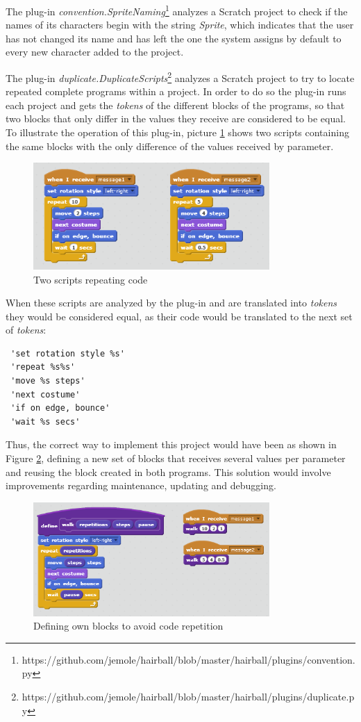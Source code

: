 \documentclass[conference]{format/IEEEtran}
\begin{document}
The plug-in \textit{convention.SpriteNaming}\footnote{https://github.com/jemole/hairball/blob/master/hairball/plugins/convention.py} analyzes a Scratch project to check if the names of its characters begin with the string \textit{Sprite}, which indicates that the user has not changed its name and has left the one the system assigns by default to every new character added to the project.

The plug-in \textit{duplicate.DuplicateScripts}\footnote{https://github.com/jemole/hairball/blob/master/hairball/plugins/duplicate.py} analyzes a Scratch project to try to locate repeated complete programs within a project. In order to do so the plug-in runs each project and gets the \textit{tokens} of the different blocks of the programs, so that two blocks that only differ in the values they receive are considered to be equal. To illustrate the operation of this plug-in, picture \ref{fig:CodeRepetition1} shows two scripts containing the same blocks with the only difference of the values received by parameter.
\begin{figure}
  \centering
    \includegraphics[width=9cm]{img/CodeRepetition1.png}
  \caption{Two scripts repeating code}
  \label{fig:CodeRepetition1}
\end{figure}


When these scripts are analyzed by the plug-in and are translated into \textit{tokens} they would be considered equal, as their code would be translated to the next set of \textit{tokens}:
\begin{verbatim}
 'set rotation style %s'
 'repeat %s%s'
 'move %s steps'
 'next costume'
 'if on edge, bounce'
 'wait %s secs'
\end{verbatim}

Thus, the correct way to implement this project would have been as shown in Figure \ref{fig:CodeRepetition2}, defining a new set of blocks that receives several values per parameter and reusing the block created in both programs. This solution would involve improvements regarding maintenance, updating and debugging.

\begin{figure}
  \centering
    \includegraphics[width=9cm]{img/CodeRepetition2.png}
  \caption{Defining own blocks to avoid code repetition}
  \label{fig:CodeRepetition2}
\end{figure}
\end{document}
